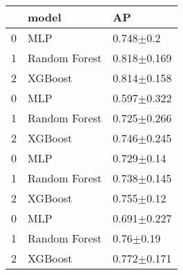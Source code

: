 \begin{tabular}{lll}
\toprule
 & model & AP \\
\midrule
0 & MLP & 0.748$\pm$0.2 \\
1 & Random Forest & 0.818$\pm$0.169 \\
2 & XGBoost & 0.814$\pm$0.158 \\
0 & MLP & 0.597$\pm$0.322 \\
1 & Random Forest & 0.725$\pm$0.266 \\
2 & XGBoost & 0.746$\pm$0.245 \\
0 & MLP & 0.729$\pm$0.14 \\
1 & Random Forest & 0.738$\pm$0.145 \\
2 & XGBoost & 0.755$\pm$0.12 \\
0 & MLP & 0.691$\pm$0.227 \\
1 & Random Forest & 0.76$\pm$0.19 \\
2 & XGBoost & 0.772$\pm$0.171 \\
\bottomrule
\end{tabular}
